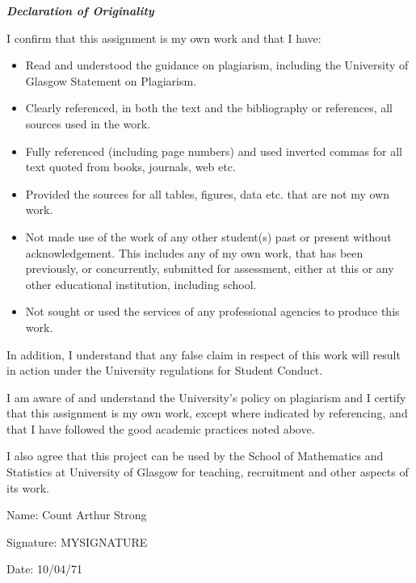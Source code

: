 \documentclass[class=guthesis, crop=false]{standalone}
\begin{document}
\parindent0pt
\parskip=5pt

{\bf \it \large Declaration of Originality}

I confirm that this assignment is my own work and that I have:
\begin{itemize}
\item Read and understood the guidance on plagiarism,
including the University of Glasgow Statement on Plagiarism.

\item Clearly referenced, in both the text and the bibliography or references, all sources used
in the work.

\item Fully referenced (including page numbers) and used inverted commas for all text
quoted from books, journals, web etc.

\item Provided the sources for all tables, figures, data etc. that are not my own work.

\item Not made use of the work of any other student(s) past or present without acknowledgement. This includes any of my own work, that has been previously, or concurrently, submitted for assessment, either at this or any other educational institution,
including school.

\item Not sought or used the services of any professional agencies to produce this work.

\end{itemize}

In addition, I understand that any false claim in respect of this work will result in
action under the University regulations for Student Conduct.

I am aware of and understand the University's policy on plagiarism and I certify that
this assignment is my own work, except where indicated by referencing, and that I
have followed the good academic practices noted above.

I also agree that this project can be used by the School of Mathematics and Statistics at
University of Glasgow for teaching, recruitment and other aspects of its work.

Name: Count Arthur Strong

Signature: MYSIGNATURE 


Date: 10/04/71
\end{document}
